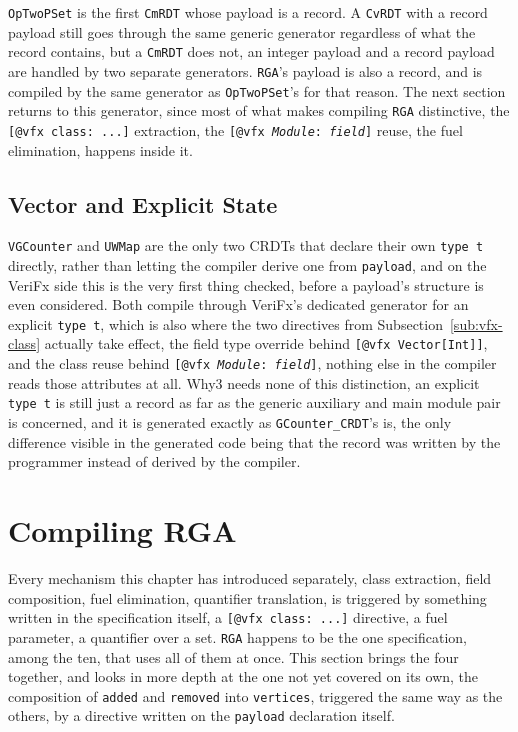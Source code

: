 \texttt{OpTwoPSet} is the first \texttt{CmRDT} whose payload is a record. A \texttt{CvRDT} with a record payload still
goes through the same generic generator regardless of what the record contains, but a \texttt{CmRDT} does not, an integer
payload and a record payload are handled by two separate generators. \texttt{RGA}'s payload is also a record, and is
compiled by the same generator as \texttt{OpTwoPSet}'s for that reason. The next section returns to this generator,
since most of what makes compiling \texttt{RGA} distinctive, the \texttt{[@vfx class: ...]} extraction, the
\texttt{[@vfx \textit{Module}: \textit{field}]} reuse, the fuel elimination, happens inside it.

\subsection{Vector and Explicit State}
\label{sub:vector-explicit}

\texttt{VGCounter} and \texttt{UWMap} are the only two CRDTs that declare their own \texttt{type t} directly, rather than
letting the compiler derive one from \texttt{payload}, and on the VeriFx side this is the very first thing checked,
before a payload's structure is even considered. Both compile through VeriFx's dedicated generator for an explicit
\texttt{type t}, which is also where the two directives from Subsection~\ref{sub:vfx-class} actually take effect, the
field type override behind \texttt{[@vfx Vector[Int]]}, and the class reuse behind \texttt{[@vfx \textit{Module}:
\textit{field}]}, nothing else in the compiler reads those attributes at all. Why3 needs none of this distinction, an
explicit \texttt{type t} is still just a record as far as the generic auxiliary and main module pair is concerned, and
it is generated exactly as \texttt{GCounter\_CRDT}'s is, the only difference visible in the generated code being that
the record was written by the programmer instead of derived by the compiler.

\section{Compiling RGA}
\label{sec:compiling-rga}

Every mechanism this chapter has introduced separately, class extraction, field composition, fuel elimination, quantifier
translation, is triggered by something written in the specification itself, a \texttt{[@vfx class: ...]} directive, a
fuel parameter, a quantifier over a set. \texttt{RGA} happens to be the one specification, among the ten, that uses all
of them at once. This section brings the four together, and looks in more depth at the one not yet covered on its own,
the composition of \texttt{added} and \texttt{removed} into \texttt{vertices}, triggered the same way as the others, by
a directive written on the \texttt{payload} declaration itself.

